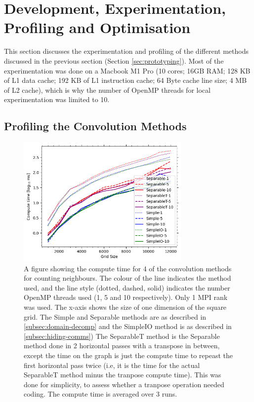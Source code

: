
\section{Development, Experimentation, Profiling and Optimisation}\label{sec:development}
    This section discusses the experimentation and profiling of the different methods discussed in the previous
    section (Section \eqref{sec:prototyping}).
    Most of the experimentation was done on a Macbook M1 Pro (10 cores; 16GB RAM; 128 KB of L1 data cache; 192 KB of L1
    instruction cache; 64 Byte cache line size; 4 MB of L2 cache), which is why the number of OpenMP threads for local
    experimentation was limited to 10.
    \subsection{Profiling the Convolution Methods}\label{subsec:prof-conv}
    \begin{figure}[htb]
    \centering
    \includegraphics[width=0.75\textwidth]{./figures/convolutions}
    \caption{A figure showing the compute time for 4 of the convolution methods for counting neighbours.
        The colour of the line indicates the method used, and the line style (dotted, dashed, solid) indicates the number
        OpenMP threads used (1, 5 and 10 respectively).
        Only 1 MPI rank was used.
        The x-axis shows the size of one dimension of the square grid.
        The Simple and Separable methods are as described in \eqref{subsec:domain-decomp} and the SimpleIO method is
        as described in \eqref{subsec:hiding-comms})
        The SeparableT method is the Separable method done in 2 horizontal passes with a transpose in between, except
        the time on the graph is just the compute time to repeast the first horizontal pass twice (i.e, it is the time
        for the actual SeparableT method minus the tranpose compute time).
        This was done for simplicity, to assess whether a tranpose operation needed coding.
        The compute time is averaged over 3 runs.}
    \label{fig:convolutions}
    \end{figure}

